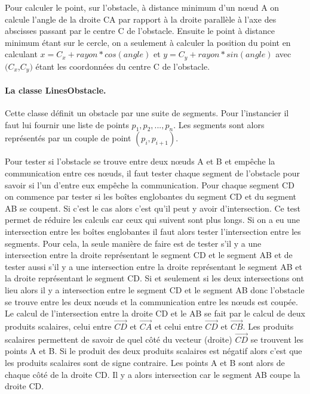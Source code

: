 \documentclass{article}
\begin{document}
Pour calculer le point, sur l'obstacle, à distance minimum d'un n\oe ud A on calcule l'angle de la droite CA par rapport à la droite parallèle à l'axe des abscisses passant par le centre C de l'obstacle. Ensuite le point à distance minimum étant sur le cercle, on a seulement à calculer la position du point  en calculant $x=C_x+rayon*cos(angle)$ et $y=C_y+rayon*sin(angle)$ avec $(C_x$,$C_y)$ étant les coordonnées du centre C de l'obstacle.

\paragraph{La classe LinesObstacle.}

Cette classe définit un obstacle par une suite de segments. Pour l'instancier il faut lui fournir une liste de points $p_1,p_2,...,p_n$. Les segments sont alors représentés par un couple de point $(p_i,p_{i+1})$.\medskip

Pour tester si l'obstacle se trouve entre deux n\oe uds A et B et empêche la communication entre ces n\oe uds, il faut tester chaque segment de l'obstacle pour savoir si l'un d'entre eux empêche la communication. Pour chaque segment CD on commence par tester si les boîtes englobantes du segment CD et du segment AB se coupent. Si c'est le cas alors c'est qu'il peut y avoir d'intersection. Ce test permet de réduire les calculs car ceux qui suivent sont plus longs. Si on a eu une intersection entre les boîtes englobantes il faut alors tester l'intersection entre les segments. Pour cela, la seule manière de faire est de tester s'il y a une intersection entre la droite représentant le segment CD et le segment AB et de tester aussi s'il y a une intersection entre la droite représentant le segment AB et la droite représentant le segment CD. Si et seulement si les deux intersections ont lieu alors il y a intersection entre le segment CD et le segment AB donc l'obstacle se trouve entre les deux n\oe uds et la communication entre les n\oe uds est coupée.\\
Le calcul de l'intersection entre la droite CD et le AB se fait par le calcul de deux produits scalaires, celui entre $\overrightarrow{CD}$ et $\overrightarrow{CA}$ et celui entre $\overrightarrow{CD}$ et $\overrightarrow{CB}$. Les produits scalaires permettent de savoir de quel côté du vecteur (droite) $\overrightarrow{CD}$ se trouvent les points A et B. Si le produit des deux produits scalaires est négatif alors c'est que les produits scalaires sont de signe contraire. Les points A et B sont alors de chaque côté de la droite CD. Il y a alors intersection car le segment AB coupe la droite CD.\medskip
\end{document}
